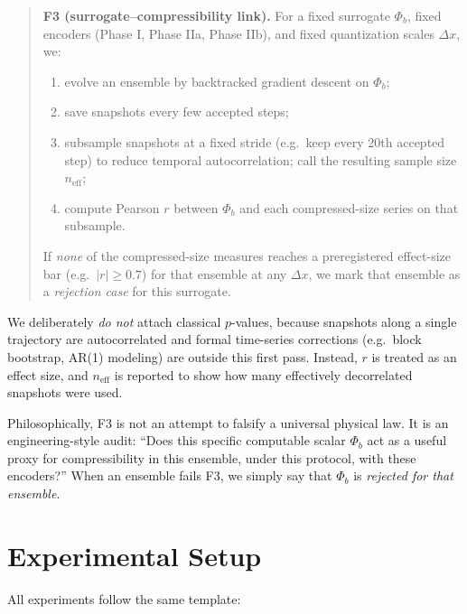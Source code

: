 \documentclass[11pt,a4paper]{article}
\numberwithin{equation}{section}
\newcommand{\phib}{\Phi_b}
\begin{document}
\begin{quote}
\textbf{F3 (surrogate--compressibility link).}  
For a fixed surrogate $\phib$, fixed encoders (Phase I, Phase IIa, Phase IIb), and fixed quantization scales $\Delta x$, we:
\begin{enumerate}[label=(\alph*)]
\item evolve an ensemble by backtracked gradient descent on $\phib$;
\item save snapshots every few accepted steps;
\item subsample snapshots at a fixed stride (e.g.\ keep every 20th accepted step) to reduce temporal autocorrelation; call the resulting sample size $n_{\text{eff}}$;
\item compute Pearson $r$ between $\phib$ and each compressed-size series on that subsample.
\end{enumerate}
If \emph{none} of the compressed-size measures reaches a preregistered effect-size bar (e.g.\ $|r|\ge 0.7$) for that ensemble at any $\Delta x$, we mark that ensemble as a \emph{rejection case} for this surrogate.
\end{quote}

We deliberately \emph{do not} attach classical $p$-values, because snapshots along a single trajectory are autocorrelated and formal time-series corrections (e.g.\ block bootstrap, AR(1) modeling) are outside this first pass. Instead, $r$ is treated as an effect size, and $n_{\text{eff}}$ is reported to show how many effectively decorrelated snapshots were used.

Philosophically, F3 is not an attempt to falsify a universal physical law. It is an engineering-style audit: ``Does this specific computable scalar $\phib$ act as a useful proxy for compressibility in this ensemble, under this protocol, with these encoders?'' When an ensemble fails F3, we simply say that $\phib$ is \emph{rejected for that ensemble}.

\section{Experimental Setup}
All experiments follow the same template:
\end{document}
